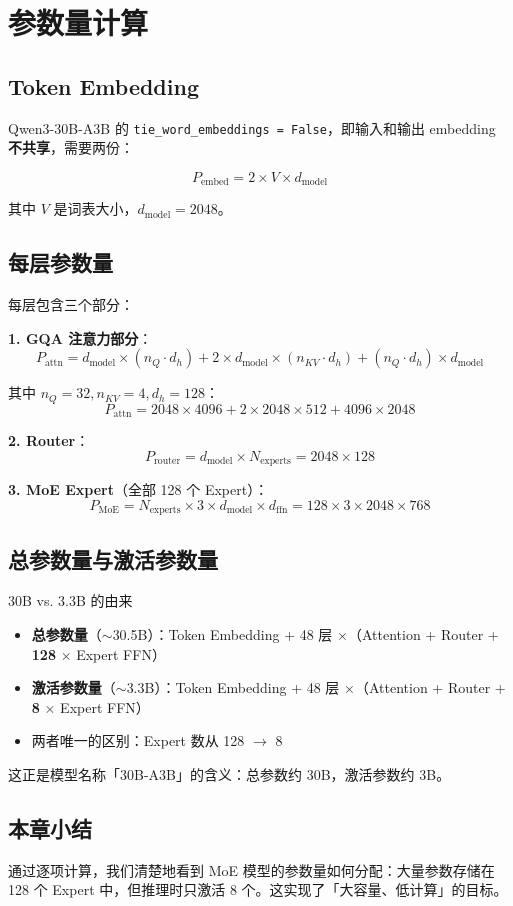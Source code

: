 \section{参数量计算}

\subsection{Token Embedding}

Qwen3-30B-A3B 的 \texttt{tie\_word\_embeddings = False}，即输入和输出 embedding \textbf{不共享}，需要两份：

$$
P_{\text{embed}} = 2 \times V \times d_{\text{model}}
$$

其中 $V$ 是词表大小，$d_{\text{model}} = 2048$。

\subsection{每层参数量}

每层包含三个部分：

\textbf{1. GQA 注意力部分}：
$$
P_{\text{attn}} = d_{\text{model}} \times (n_Q \cdot d_h) + 2 \times d_{\text{model}} \times (n_{KV} \cdot d_h) + (n_Q \cdot d_h) \times d_{\text{model}}
$$

其中 $n_Q = 32, n_{KV} = 4, d_h = 128$：
$$
P_{\text{attn}} = 2048 \times 4096 + 2 \times 2048 \times 512 + 4096 \times 2048
$$

\textbf{2. Router}：
$$
P_{\text{router}} = d_{\text{model}} \times N_{\text{experts}} = 2048 \times 128
$$

\textbf{3. MoE Expert}（全部 128 个 Expert）：
$$
P_{\text{MoE}} = N_{\text{experts}} \times 3 \times d_{\text{model}} \times d_{\text{ffn}} = 128 \times 3 \times 2048 \times 768
$$

\subsection{总参数量与激活参数量}

\begin{importantbox}{30B vs. 3.3B 的由来}
\begin{itemize}
  \item \textbf{总参数量}（$\sim$30.5B）：Token Embedding + 48 层 $\times$（Attention + Router + \textbf{128} $\times$ Expert FFN）
  \item \textbf{激活参数量}（$\sim$3.3B）：Token Embedding + 48 层 $\times$（Attention + Router + \textbf{8} $\times$ Expert FFN）
  \item 两者唯一的区别：Expert 数从 128 $\to$ 8
\end{itemize}
\end{importantbox}

这正是模型名称「30B-A3B」的含义：总参数约 30B，激活参数约 3B。

\subsection{本章小结}

通过逐项计算，我们清楚地看到 MoE 模型的参数量如何分配：大量参数存储在 128 个 Expert 中，但推理时只激活 8 个。这实现了「大容量、低计算」的目标。

